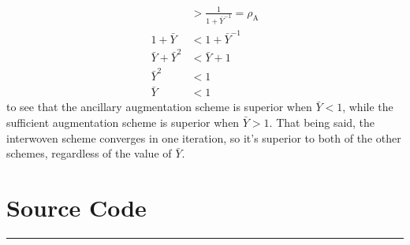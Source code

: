 \begin{enumerate}
\begin{enumerate}
\begin{align*}
        &>
        \frac{1}{1 + \bar{Y}^{-1}}
        =
        \rho_\mathrm{A}
        \\
        1 + \bar{Y} &< 1 + \bar{Y}^{-1}
        \\
        \bar{Y} + \bar{Y}^2 &< \bar{Y} + 1
        \\
        \bar{Y}^2 &< 1
        \\
        \bar{Y} &< 1
        \end{align*}
    to see that the ancillary augmentation scheme is superior when 
    $\bar{Y} < 1$, 
    while the sufficient augmentation scheme is superior when $\bar{Y} > 1$.
    That being said, the interwoven scheme converges in one iteration,
    so it's superior to both of the other schemes,
    regardless of the value of $\bar{Y}$.

    \end{enumerate}

\end{enumerate}

\clearpage
\chapter*{Source Code}
\hrule



